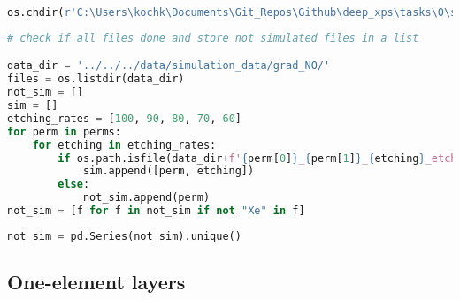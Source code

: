 \begin{lstlisting}[language=Python]
os.chdir(r'C:\Users\kochk\Documents\Git_Repos\Github\deep_xps\tasks\0\simulation')
\end{lstlisting}

\begin{lstlisting}[language=Python]
# check if all files done and store not simulated files in a list

data_dir = '../../../data/simulation_data/grad_NO/'
files = os.listdir(data_dir)
not_sim = []
sim = []
etching_rates = [100, 90, 80, 70, 60]
for perm in perms:
    for etching in etching_rates:
        if os.path.isfile(data_dir+f'{perm[0]}_{perm[1]}_{etching}_etching_spectra.spcreg1.spc'):
            sim.append([perm, etching])
        else:
            not_sim.append(perm)
not_sim = [f for f in not_sim if not "Xe" in f]
\end{lstlisting}

\begin{lstlisting}[language=Python]
not_sim = pd.Series(not_sim).unique()
\end{lstlisting}

\hypertarget{one-element-layers}{%
\subsection{One-element layers}\label{one-element-layers}}

